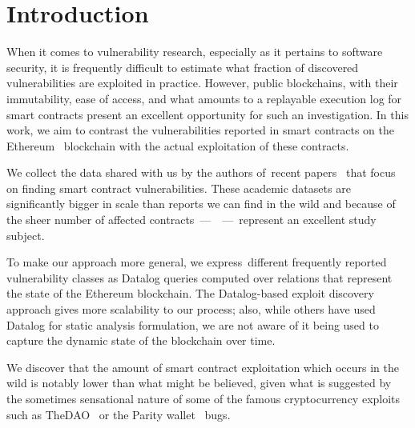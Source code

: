 \section{Introduction}
\label{sec:introduction}

When it comes to vulnerability research, especially as it pertains to software security, it is frequently difficult to estimate what fraction of discovered vulnerabilities are exploited in practice. However, public blockchains, with their immutability, ease of access, and what amounts to a replayable execution log for smart contracts present an excellent opportunity for such an investigation. 
In this work, we aim to contrast the vulnerabilities reported in smart contracts on the Ethereum~\cite{Buterin2014} blockchain with the actual exploitation of these contracts.

We collect the data shared with us by the authors of~\PapersAnalyzed recent papers~\cite{Luu2016a,DBLP:conf/ndss/KalraGDS18,Tsankov2018,Grech2018,Nikolic2018a,Krupp2018} that focus on finding smart contract vulnerabilities. These academic datasets are significantly bigger in scale than reports we can find in the wild and because of the sheer number of affected contracts~---~\VulnerableContracts~---~represent an excellent study subject. 

To make our approach more general, we express~\VulnTypes different frequently reported vulnerability classes as Datalog queries computed over relations that represent the state of the Ethereum blockchain. The Datalog-based exploit discovery approach gives more scalability to our process; also, while others have used Datalog for static analysis formulation, we are not aware of it being used to capture the dynamic state of the blockchain over time.

We discover that the amount of smart contract exploitation which occurs in the wild is notably lower than what might be believed, given what is suggested by the sometimes sensational nature of some of the famous cryptocurrency exploits such as TheDAO~\cite{Securities2017} or the Parity wallet~\cite{Breidenbach} bugs.

